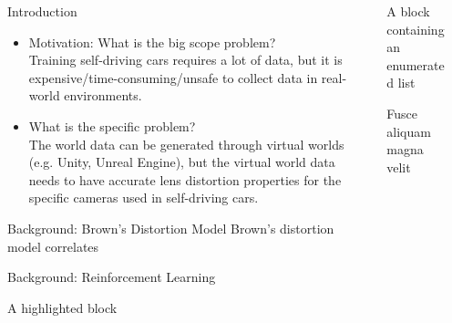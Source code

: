\documentclass[final]{beamer}
\newlength{\sepwidth}
\newlength{\colwidth}
\newcommand{\separatorcolumn}{\begin{column}{\sepwidth}\end{column}}
\begin{document}
\begin{frame}[t]
\begin{columns}[t]
\separatorcolumn

\begin{column}{\colwidth}

  \begin{block}{Introduction}

    \begin{itemize}
      \item Motivation: What is the big scope problem?\\
      Training self-driving cars requires a lot of data, but it is expensive/time-consuming/unsafe to collect data in real-world environments.\\
      \item What is the specific problem?\\
      The world data can be generated through virtual worlds (e.g. Unity, Unreal Engine), but the virtual world data needs to have accurate lens distortion properties for the specific cameras used in self-driving cars.
    \end{itemize}

  \end{block}

  \begin{block}{Background: Brown's Distortion Model}
    Brown's distortion model correlates
  \end{block}

  \begin{block}{Background: Reinforcement Learning}

  \end{block}

  \begin{alertblock}{A highlighted block}

  \end{alertblock}

\end{column}

\separatorcolumn

\begin{column}{\colwidth}

  \begin{block}{A block containing an enumerated list}

  \end{block}

  \begin{block}{Fusce aliquam magna velit}


\end{block}
\end{column}
\end{columns}
\end{frame}
\end{document}
